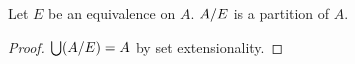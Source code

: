 \begin{proposition}\label{quotient_partition_of}
    Let $E$ be an equivalence on $A$.
    $A/E$ is a partition of $A$.
\end{proposition}
\begin{proof}
    $\bigcup (A/E) = A$ by set extensionality.
\end{proof}


%
%
%
%
%
%
%
%
%